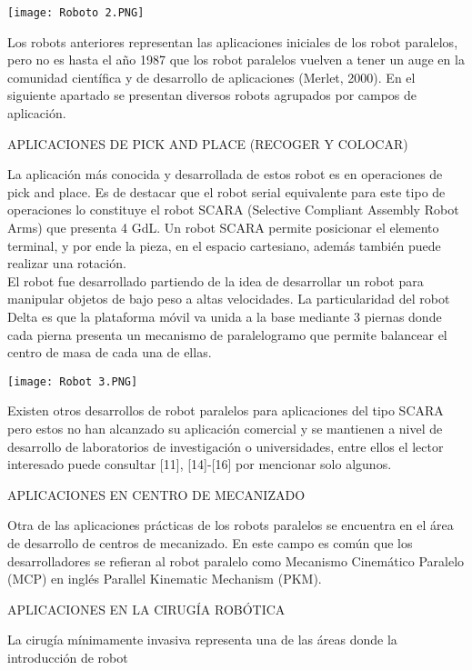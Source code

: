\documentclass[12pt,letterpaper]{report}
\begin{document}
\begin{flushleft}
\texttt{[image: Roboto 2.PNG]}\\
\begin{flushleft}
Los robots anteriores representan las aplicaciones iniciales de los robot paralelos, pero no es hasta el año 1987 que los robot paralelos vuelven a tener un auge en la comunidad científica y de desarrollo de aplicaciones (Merlet, 2000). En el siguiente apartado se presentan diversos robots agrupados por campos de aplicación. 
\begin{center}
APLICACIONES DE PICK AND PLACE (RECOGER Y COLOCAR) 
\begin{flushleft}
La aplicación más conocida y desarrollada de estos robot es en  operaciones de pick and place. Es de destacar que el robot serial equivalente para este tipo de operaciones lo constituye el robot SCARA (Selective Compliant Assembly Robot Arms) que presenta 4 GdL. Un robot SCARA permite posicionar el elemento terminal, y por ende la pieza, en el espacio cartesiano,  además también puede realizar una rotación.\\
  El robot fue desarrollado partiendo de la idea de desarrollar un robot para manipular objetos de bajo peso a altas velocidades. La particularidad del robot Delta es que la plataforma móvil va unida a la base mediante 3 piernas donde cada pierna presenta un mecanismo de paralelogramo que permite balancear el centro de masa de cada una de ellas.
  \begin{center}
  \texttt{[image: Robot 3.PNG]} 
  \begin{flushleft}
  Existen otros desarrollos de robot paralelos para aplicaciones del tipo SCARA pero estos no han alcanzado su aplicación comercial y se mantienen a nivel de desarrollo de laboratorios de investigación o universidades, entre ellos el lector interesado puede consultar [11], [14]-[16] por mencionar solo algunos. 
  \begin{center}
  APLICACIONES EN CENTRO DE MECANIZADO
  \begin{flushleft}
  Otra de las aplicaciones prácticas de los robots paralelos se encuentra en el área de desarrollo de centros de mecanizado. En este campo es común que los desarrolladores se refieran al robot paralelo como Mecanismo Cinemático Paralelo (MCP) en inglés Parallel Kinematic Mechanism (PKM). 
  \begin{center}
  APLICACIONES EN LA CIRUGÍA ROBÓTICA 
  \begin{flushleft}
  La cirugía mínimamente invasiva representa una de las áreas donde la introducción de robot 

\end{flushleft}
\end{center}
\end{flushleft}
\end{center}
\end{flushleft}
\end{center}
\end{flushleft}
\end{center}
\end{flushleft}
\end{flushleft}
\end{document}
